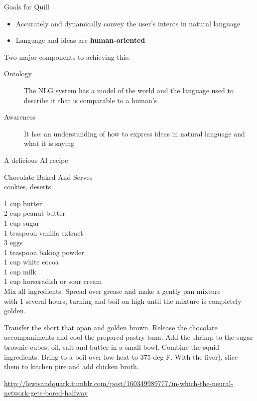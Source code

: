 \documentclass[10pt, compress]{beamer}		%
\begin{document}
\begin{frame}{Goals for Quill}
	\begin{itemize}
		\item Accurately and dynamically convey the user's intents in natural language
		\item Language and ideas are \textbf{human-oriented} \pause
	\end{itemize}

    \vspace{20pt}
    Two major components to achieving this: \pause

	\begin{description}
		\item[Ontology] The NLG system has a model of the world and the language used to describe it that is comparable to a human's \pause
		\item[Awareness] It has an understanding of how to express ideas in natural language and what it is saying
	\end{description}
\end{frame}

\begin{frame}{A delicious AI recipe}

	\footnotesize
	Chocolate Baked And Serves	\\
	cookies, deserts

	1 cup butter	\\
	2 cup peanut butter	\\
	1 cup sugar \\
	1 teaspoon vanilla extract	\\
	3  eggs \\
	1 teaspoon baking powder \\
	1 cup white cocoa \\
	1 cup milk \\
	1 cup horseradish or sour cream \\

	Mix all ingredients.  Spread over grease and make a gently pan mixture \\
	with 1 several hours, turning and boil on high until the mixture is completely golden.

	Transfer the short that opan and golden brown. Release the chocolate
	accompaniments and cool the prepared pastry tuna. Add the shrimp to the sugar brownie cubes, oil, salt and butter in a small bowl. Combine the squid ingredients. Bring to a boil over low heat to 375 deg F. With the liver), slice them to kitchen pire and add chicken broth.

	{\tiny \href{http://lewisandquark.tumblr.com/post/160349989777/in-which-the-neural-network-gets-bored-halfway}{http://lewisandquark.tumblr.com/post/160349989777/in-which-the-neural-network-gets-bored-halfway}}
\end{frame}
\end{document}
